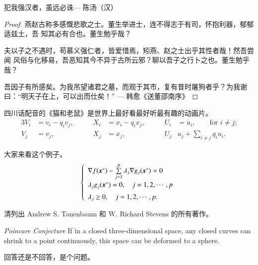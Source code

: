 				\begin{theorem}
					\label{thm-theorem-example}
					犯我强汉者，虽远必诛\hfill --- 陈汤（汉）
				\end{theorem}
				
				\begin{proof}
					\label{thm-proof-example}
					燕赵古称多感慨悲歌之士。董生举进士，连不得志于有司，怀抱利器，郁郁适兹土，吾
					知其必有合也。董生勉乎哉？
					
					夫以子之不遇时，苟慕义强仁者，皆爱惜焉，矧燕、赵之士出乎其性者哉！然吾尝闻
					风俗与化移易，吾恶知其今不异于古所云邪？聊以吾子之行卜之也。董生勉乎哉？
					
					吾因子有所感矣。为我吊望诸君之墓，而观于其市，复有昔时屠狗者乎？为我谢
					曰：“明天子在上，可以出而仕矣！” \hfill --- 韩愈《送董邵南序》
				\end{proof}
				
				\begin{corollary}
					\label{thm-corollary-example}
					四川话配音的《猫和老鼠》是世界上最好看最好听最有趣的动画片。
					\begin{alignat}{3}
						V_i & =v_i - q_i v_j, & \qquad X_i & = x_i - q_i x_j, &
						\qquad U_i & = u_i, \qquad \text{for $i\ne j$;} \\
						V_j & = v_j,          & \qquad X_j & = x_j, &
						\qquad U_j & u_j + \sum_{i\ne j} q_i u_i.
					\end{alignat}
				\end{corollary}
				
				\begin{example}
					\label{thm-example-example}
					大家来看这个例子。
					\begin{equation}
						\left\{
						\begin{array}{l}
							\nabla f({\mbox{\boldmath $x$}}^*)-
							\sum\limits_{j=1}^p\lambda_j\nabla g_j
							({\mbox{\boldmath $x$}}^*)=0 \\ [0.3cm]
							\lambda_jg_j({\mbox{\boldmath $x$}}^*)=0,
							\quad j=1,2,\cdots,p \\ [0.2cm]
							\lambda_j\ge 0,\quad j=1,2,\cdots,p.
						\end{array}
						\right.
					\end{equation}
				\end{example}
				
				\begin{exercise}
					\label{thm-exercise-example}
					清列出 Andrew S. Tanenbaum 和 W. Richard Stevens 的所有著作。
				\end{exercise}
				
				\begin{conjecture}
					\label{thm-conjecture-example}
					\textit{Poincare Conjecture} If in a closed three-dimensional space,
					any closed curves can shrink to a point continuously,
					this space can be deformed to a sphere.
				\end{conjecture}
				
				\begin{problem}
					\label{thm-problem-example}
					回答还是不回答，是个问题。
				\end{problem}
